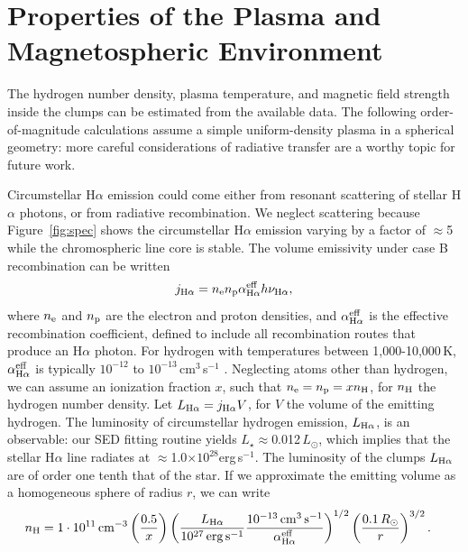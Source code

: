 \documentclass[11pt,twocolumn,tighten,linenumbers]{aastex7}
\begin{document}
\section{Properties of the Plasma and Magnetospheric Environment}
\label{subsec:gas}

The hydrogen number density, plasma temperature, and magnetic field
strength inside the clumps can be estimated from the available data.  
The following order-of-magnitude calculations assume a simple
uniform-density plasma in a spherical geometry: more careful
considerations of radiative transfer are a worthy topic for future
work.

Circumstellar H$\alpha$ emission could come either from resonant
scattering of stellar H$\alpha$ photons, or from radiative
recombination.  We neglect scattering because Figure~\ref{fig:spec}
shows the
circumstellar H$\alpha$ emission varying by a factor of $\approx$5
while the chromospheric line core is stable.  The volume emissivity
under case B recombination can be written \begin{equation}
  j_{\rm H\alpha} = n_{\rm e} n_{\rm p} \alpha^{\rm eff}_{\rm H\alpha} h \nu_{\rm H\alpha},
\end{equation} where $n_{\rm e}$ and $n_{\rm p}$ are the electron and
proton densities, and $\alpha^{\rm eff}_{\rm H\alpha}$ is the
effective recombination coefficient, defined to include all
recombination routes that produce an H$\alpha$ photon.  For hydrogen
with temperatures between 1,000-10,000\,K, $\alpha^{\rm eff}_{\rm
H\alpha}$ is typically $10^{-12}$ to
$10^{-13}$\,cm$^3$\,s$^{-1}$ \citep{Hummer1987,Draine2011}.
Neglecting atoms other than hydrogen, we can assume an
ionization fraction $x$, such that $n_{\rm e} = n_{\rm p} = x n_{\rm
H}$, for $n_{\rm H}$ the hydrogen number density.  Let $L_{\rm
H\alpha} = j_{\rm H\alpha} V$, for $V$ the volume of the emitting
hydrogen.  The luminosity of circumstellar hydrogen emission, $L_{\rm
H\alpha}$, is an observable: our SED fitting routine yields
$L_\star$$\approx$0.012\,$L_\odot$, which implies that the stellar
H$\alpha$ line radiates at $\approx$1.0$\times$$10^{28}$erg\,s$^{-1}$.
The luminosity of the clumps $L_{\rm H\alpha}$ are of order one tenth
that of the star.  If we approximate the emitting volume as a
homogeneous sphere of radius $r$, we can write
\begin{align}
  n_{\rm H} &= 
  1 \cdot 10^{11}\,{\rm cm}^{-3}
  \left(
    \frac{0.5}{x}
  \right)
  \left( 
    \frac{ L_{\rm H\alpha} }{ 10^{27}\,{\rm erg\,s^{-1}} }
    \frac{ 10^{-13}\,{\rm cm^{3}\,s^{-1}} }{ \alpha^{\rm eff}_{\rm H\alpha} }
  \right)^{1/2}
  \left(
    \frac{ 0.1\,R_\odot }{ r }
  \right)^{3/2}.
  \label{eq:numdensity}
\end{align}
\end{document}
